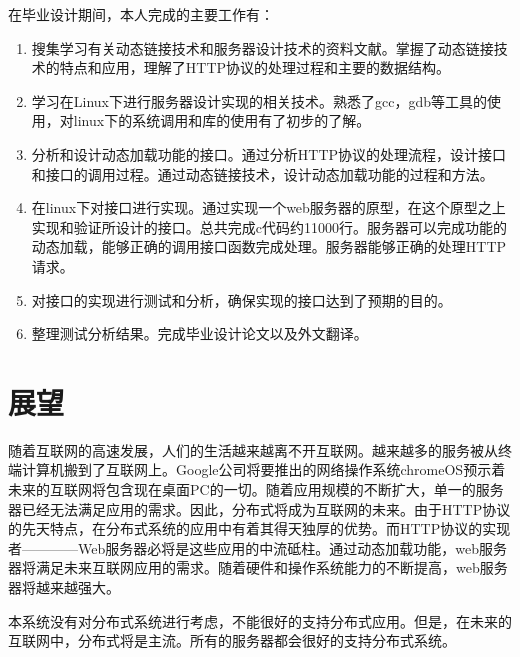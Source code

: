 \documentclass[twoside, xetex]{report}
\begin{document}
	在毕业设计期间，本人完成的主要工作有：
	\begin{enumerate}
		\item 搜集学习有关动态链接技术和服务器设计技术的资料文献。掌握了动态链接技术的特点和应用，理解了HTTP协议的处理过程和主要的数据结构。
		\item 学习在Linux下进行服务器设计实现的相关技术。熟悉了gcc，gdb等工具的使用，对linux下的系统调用和库的使用有了初步的了解。
		\item 分析和设计动态加载功能的接口。通过分析HTTP协议的处理流程，设计接口和接口的调用过程。通过动态链接技术，设计动态加载功能的过程和方法。
		\item 在linux下对接口进行实现。通过实现一个web服务器的原型，在这个原型之上实现和验证所设计的接口。总共完成c代码约11000行。服务器可以完成功能的动态加载，能够正确的调用接口函数完成处理。服务器能够正确的处理HTTP请求。
		\item 对接口的实现进行测试和分析，确保实现的接口达到了预期的目的。
		\item 整理测试分析结果。完成毕业设计论文以及外文翻译。
	\end{enumerate}
	
\section{展望}
	随着互联网的高速发展，人们的生活越来越离不开互联网。越来越多的服务被从终端计算机搬到了互联网上。Google公司将要推出的网络操作系统chromeOS预示着未来的互联网将包含现在桌面PC的一切。随着应用规模的不断扩大，单一的服务器已经无法满足应用的需求。因此，分布式将成为互联网的未来。由于HTTP协议的先天特点，在分布式系统的应用中有着其得天独厚的优势。而HTTP协议的实现者————Web服务器必将是这些应用的中流砥柱。通过动态加载功能，web服务器将满足未来互联网应用的需求。随着硬件和操作系统能力的不断提高，web服务器将越来越强大。
	
	本系统没有对分布式系统进行考虑，不能很好的支持分布式应用。但是，在未来的互联网中，分布式将是主流。所有的服务器都会很好的支持分布式系统。
\end{document}
